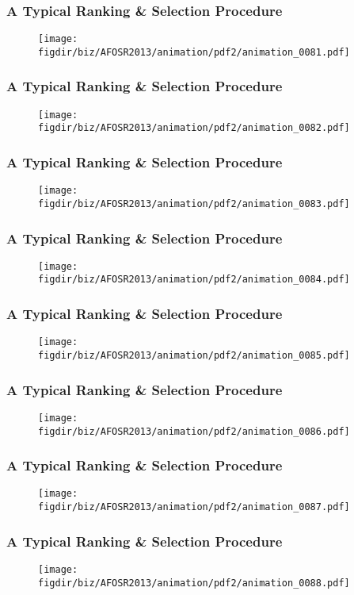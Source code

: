 \documentclass[13pt]{beamer}
\newcommand{\figdir}{../../fig}
\begin{document}
{\begin{frame}\frametitle{A Typical Ranking \& Selection Procedure}\begin{figure}\texttt{[image: \\figdir/biz/AFOSR2013/animation/pdf2/animation\_0081.pdf]}\end{figure}\end{frame}
\begin{frame}\frametitle{A Typical Ranking \& Selection Procedure}\begin{figure}\texttt{[image: \\figdir/biz/AFOSR2013/animation/pdf2/animation\_0082.pdf]}\end{figure}\end{frame}
\begin{frame}\frametitle{A Typical Ranking \& Selection Procedure}\begin{figure}\texttt{[image: \\figdir/biz/AFOSR2013/animation/pdf2/animation\_0083.pdf]}\end{figure}\end{frame}
\begin{frame}\frametitle{A Typical Ranking \& Selection Procedure}\begin{figure}\texttt{[image: \\figdir/biz/AFOSR2013/animation/pdf2/animation\_0084.pdf]}\end{figure}\end{frame}
\begin{frame}\frametitle{A Typical Ranking \& Selection Procedure}\begin{figure}\texttt{[image: \\figdir/biz/AFOSR2013/animation/pdf2/animation\_0085.pdf]}\end{figure}\end{frame}
\begin{frame}\frametitle{A Typical Ranking \& Selection Procedure}\begin{figure}\texttt{[image: \\figdir/biz/AFOSR2013/animation/pdf2/animation\_0086.pdf]}\end{figure}\end{frame}
\begin{frame}\frametitle{A Typical Ranking \& Selection Procedure}\begin{figure}\texttt{[image: \\figdir/biz/AFOSR2013/animation/pdf2/animation\_0087.pdf]}\end{figure}\end{frame}
\begin{frame}\frametitle{A Typical Ranking \& Selection Procedure}\begin{figure}\texttt{[image: \\figdir/biz/AFOSR2013/animation/pdf2/animation\_0088.pdf]}\end{figure}\end{frame}
}
\end{document}
